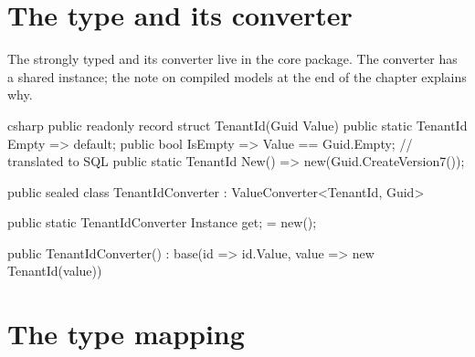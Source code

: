\section{The type and its converter}

The strongly typed  and its converter live in the core package.
The converter has a shared instance; the note on compiled models at the end of the chapter
explains why.

\begin{sourcecode}{csharp}
public readonly record struct TenantId(Guid Value)
{
    public static TenantId Empty => default;
    public bool IsEmpty => Value == Guid.Empty;              // translated to SQL
    public static TenantId New() => new(Guid.CreateVersion7());
}

public sealed class TenantIdConverter : ValueConverter<TenantId, Guid>
{
    public static TenantIdConverter Instance { get; } = new();

    public TenantIdConverter()
        : base(id => id.Value, value => new TenantId(value))
    {
    }
}
\end{sourcecode}

\section{The type mapping}

